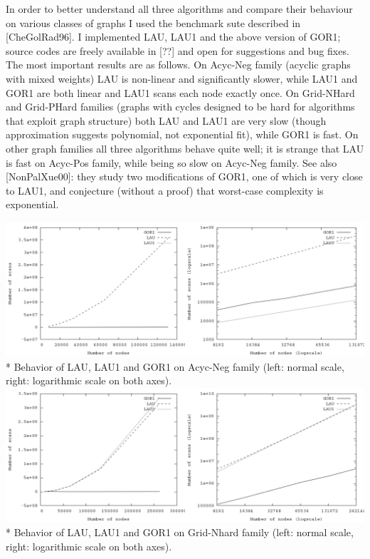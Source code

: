 \documentclass{article}
\theoremstyle{definition}
\begin{document}
\begin{multicols}{2}
In order to better understand all three algorithms and compare their behaviour on various classes of graphs
I used the benchmark sute described in [CheGolRad96].
I implemented LAU, LAU1 and the above version of GOR1;
source codes are freely available in [??] and open for suggestions and bug fixes.
The most important results are as follows.
On Acyc-Neg family (acyclic graphs with mixed weights)
LAU is non-linear and significantly slower,
while LAU1 and GOR1 are both linear and LAU1 scans each node exactly once.
On Grid-NHard and Grid-PHard families (graphs with cycles designed to be hard for algorithms that exploit graph structure)
both LAU and LAU1 are very slow (though approximation suggests polynomial, not exponential fit),
while GOR1 is fast.
On other graph families all three algorithms behave quite well;
it is strange that LAU is fast on Acyc-Pos family, while being so slow on Acyc-Neg family.
See also [NonPalXue00]: they study two modifications of GOR1, one of which is very close to LAU1,
and conjecture (without a proof) that worst-case complexity is exponential.

\end{multicols}

\begin{center}
\includegraphics[width=\linewidth]{img/plot_acyc_neg_both.png}\\*
\small{Behavior of LAU, LAU1 and GOR1 on Acyc-Neg family (left: normal scale, right: logarithmic scale on both axes).}
\includegraphics[width=\linewidth]{img/plot_grid_nhard_both.png}\\*
\small{Behavior of LAU, LAU1 and GOR1 on Grid-Nhard family (left: normal scale, right: logarithmic scale on both axes).}
\end{center}
\end{document}
